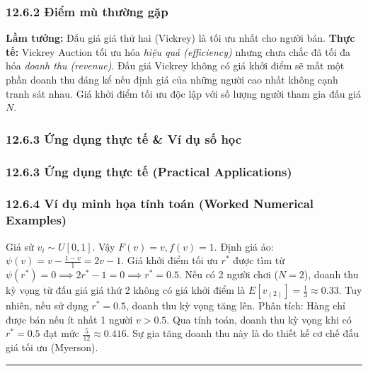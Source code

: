 \documentclass[
]{article}
\begin{document}
\subsubsection{12.6.2 Điểm mù thường
gặp}\label{ux111iux1ec3m-muxf9-thux1b0ux1eddng-gux1eb7p-5}

\textbf{Lầm tưởng:} Đấu giá giá thứ hai (Vickrey) là tối ưu nhất cho
người bán. \textbf{Thực tế:} Vickrey Auction tối ưu hóa \emph{hiệu quả
(efficiency)} nhưng chưa chắc đã tối đa hóa \emph{doanh thu (revenue)}.
Đấu giá Vickrey không có giá khởi điểm sẽ mất một phần doanh thu đáng kể
nếu định giá của những người cao nhất không cạnh tranh sát nhau. Giá
khởi điểm tối ưu độc lập với số lượng người tham gia đấu giá \(N\).

\subsubsection{12.6.3 Ứng dụng thực tế \& Ví dụ số
học}\label{ux1ee9ng-dux1ee5ng-thux1ef1c-tux1ebf-vuxed-dux1ee5-sux1ed1-hux1ecdc-5}

\subsubsection{12.6.3 Ứng dụng thực tế (Practical
Applications)}\label{ux1ee9ng-dux1ee5ng-thux1ef1c-tux1ebf-practical-applications-45}

\subsubsection{12.6.4 Ví dụ minh họa tính toán (Worked Numerical
Examples)}\label{vuxed-dux1ee5-minh-hux1ecda-tuxednh-touxe1n-worked-numerical-examples-37}

Giả sử \(v_i \sim U[0, 1]\). Vậy \(F(v) = v, f(v) = 1\). Định giá ảo:
\(\psi(v) = v - \frac{1-v}{1} = 2v - 1\). Giá khởi điểm tối ưu \(r^*\)
được tìm từ \(\psi(r^*) = 0 \implies 2r^* - 1 = 0 \implies r^* = 0.5\).
Nếu có 2 người chơi (\(N=2\)), doanh thu kỳ vọng từ đấu giá giá thứ 2
không có giá khởi điểm là \(E[v_{(2)}] = \frac{1}{3} \approx 0.33\). Tuy
nhiên, nếu sử dụng \(r^* = 0.5\), doanh thu kỳ vọng tăng lên. Phân tích:
Hàng chỉ được bán nếu ít nhất 1 người \(v > 0.5\). Qua tính toán, doanh
thu kỳ vọng khi có \(r^* = 0.5\) đạt mức \(\frac{5}{12} \approx 0.416\).
Sự gia tăng doanh thu này là do thiết kế cơ chế đấu giá tối ưu
(Myerson).

\begin{center}\rule{0.5\linewidth}{0.5pt}\end{center}
\end{document}
